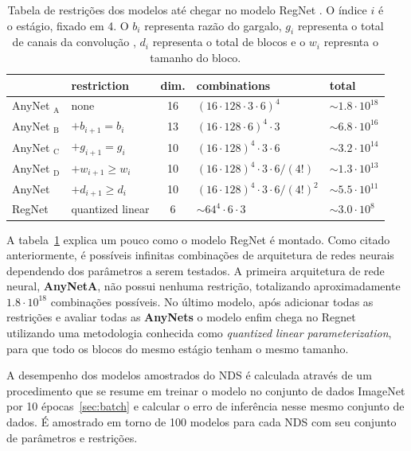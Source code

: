 \documentclass[ %
	msc, %
	portugues %
]{../ppgccufmg}
\begin{document}
    \begin{table}[!h]
    \centering
        \caption{Tabela de restrições dos modelos até chegar no modelo RegNet \citep{designspace}. O índice $i$ é o
    estágio, fixado em 4. O $b_{i}$ representa
    razão do gargalo, $g_{i}$ representa o total de canais da convolução , $d_{i}$ representa o
        total de blocos e o $w_{i}$ represnta o tamanho do bloco.}
    \label{tab:any}
    \begin{tabular}{l|l|c|l|l}
    & restriction & dim. & combinations & total \\
    \hline AnyNet \(_{\mathrm{A}}\) & none & 16 & \((16 \cdot 128 \cdot 3 \cdot 6)^{4}\) & \(\sim 1.8 \cdot 10^{18}\) \\
    AnyNet \(_{\mathrm{B}}\) & \(+b_{i+1}=b_{i}\) & 13 & \((16 \cdot 128 \cdot 6)^{4} \cdot 3\) & \(\sim 6.8 \cdot 10^{16}\) \\
    AnyNet \(_{\mathrm{C}}\) & \(+g_{i+1}=g_{i}\) & 10 & \((16 \cdot 128)^{4} \cdot 3 \cdot 6\) & \(\sim 3.2 \cdot 10^{14}\) \\
    AnyNet \(_{\mathrm{D}}\) & \(+w_{i+1} \geq w_{i}\) & 10 & \((16 \cdot 128)^{4} \cdot 3 \cdot 6 /(4 !)\) & \(\sim 1.3 \cdot 10^{13}\) \\
    AnyNet & \(+d_{i+1} \geq d_{i}\) & 10 & \((16 \cdot 128)^{4} \cdot 3 \cdot 6 /(4 !)^{2}\) & \(\sim 5.5 \cdot 10^{11}\) \\
    RegNet & quantized linear & 6 & \(\sim 64^{4} \cdot 6 \cdot 3\) & \(\sim 3.0 \cdot 10^{8}\)
    \end{tabular}
    \end{table}

    A tabela~\ref{tab:any} explica um pouco como o modelo RegNet é montado. Como citado
    anteriormente, é possíveis infinitas combinações de arquitetura de redes neurais dependendo dos
    parâmetros a serem testados. A primeira arquitetura de rede neural, \textbf{AnyNetA}, não possui nenhuma restrição,
    totalizando aproximadamente $1.8 \cdot 10^{18}$ combinações possíveis. No último modelo, após
    adicionar todas as restrições e avaliar todas as \textbf{AnyNets} o modelo enfim chega no Regnet
    utilizando uma metodologia conhecida como \textit{quantized linear parameterization}, para que
    todo os blocos do mesmo estágio tenham o mesmo tamanho.

    A desempenho dos modelos amostrados do NDS é calculada através de um procedimento que se resume
    em treinar o modelo no conjunto de dados ImageNet \citep{5206848} por 10 épocas~\ref{sec:batch}
    e calcular o erro de inferência nesse mesmo conjunto de dados. É amostrado em torno de 100
    modelos para cada NDS com seu conjunto de parâmetros e restrições.
\end{document}
